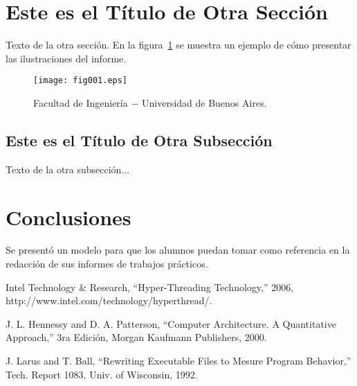 \documentclass[a4paper]{article}
\begin{document}
\section{Este es el Título de Otra Sección}

Texto de la otra sección. En la figura~\ref{fig001} se muestra un ejemplo de cómo presentar las ilustraciones del informe.

\begin{figure}[!htp]
\begin{center}
\texttt{[image: fig001.eps]}
\caption{Facultad de Ingeniería $-$ Universidad de Buenos Aires.} \label{fig001}
\end{center}
\end{figure}


\subsection{Este es el Título de Otra Subsección}

Texto de la otra subsección...


\section{Conclusiones}

Se presentó un modelo para que los alumnos puedan tomar como referencia en la redacción de sus informes de trabajos prácticos.


\begin{thebibliography}{99}

 Intel Technology \& Research, ``Hyper-Threading Technology,'' 2006, http://www.intel.com/technology/hyperthread/.

 J. L. Hennessy and D. A. Patterson, ``Computer Architecture. A Quantitative
Approach,'' 3ra Edición, Morgan Kaufmann Publishers, 2000.

 J. Larus and T. Ball, ``Rewriting Executable Files to Mesure Program Behavior,'' Tech. Report 1083, Univ. of Wisconsin, 1992.

\end{thebibliography}
\end{document}

